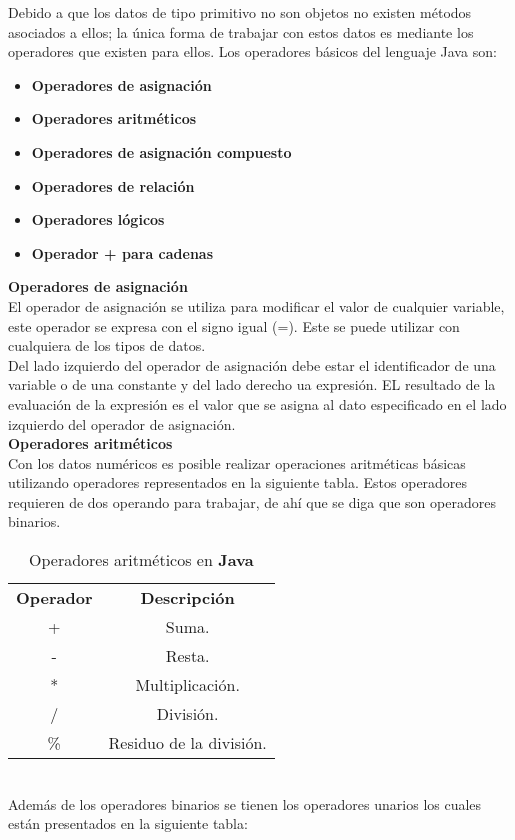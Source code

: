 \documentclass[12pt, A4]{article}
\begin{document}
{{{			Debido a que los datos de tipo primitivo no son objetos  no existen métodos asociados a ellos; la única forma de trabajar con estos datos es mediante los operadores que existen para ellos. Los operadores básicos del lenguaje Java son:
			\begin{itemize}
				\item \textbf{Operadores de asignaci\'on }
				\item \textbf{Operadores aritméticos }
				\item \textbf{Operadores de asignación compuesto }
				\item \textbf{Operadores de relación}
				\item \textbf{Operadores lógicos }
				\item \textbf{Operador + para cadenas }
			\end{itemize}
		 \textbf{{{\Large }Operadores de asignaci\'on }}\\El operador de asignación se utiliza para modificar el valor de cualquier variable, este operador se expresa con el signo igual (=). Este se puede utilizar con cualquiera de los tipos de datos.\\Del lado izquierdo del operador de asignación debe estar el identificador de una variable o de una constante y del lado derecho ua expresión. EL resultado de la evaluación de la expresión es el valor que se asigna al dato especificado en el lado izquierdo del operador de asignación.\\
		\textbf{{{\Large } Operadores aritméticos  }}\\  Con los datos numéricos es posible realizar operaciones aritméticas básicas utilizando operadores representados en la siguiente tabla. Estos operadores requieren de dos operando para trabajar, de ahí que se diga que son operadores binarios.
			\begin{table}[h!]
			\centering
			\begin{tabular}{c | c}
			\textbf{Operador} & \textbf{Descripción} \\
				+ & Suma.\\
				- & Resta.\\
				* & Multiplicaci\'on.\\
			/ & Divisi\'on.\\
				\% & Residuo de la división.\\ \hline
			\end{tabular}
			\caption{Operadores aritméticos en \textbf{Java}}
		\end{table}
	\\Adem\'as de los operadores binarios se tienen los operadores unarios los cuales están presentados en la siguiente tabla:
}}}
\end{document}
